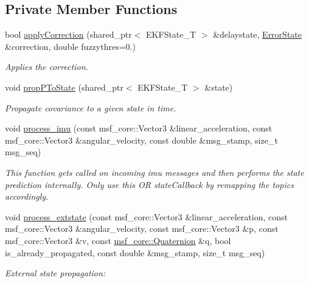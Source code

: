 \subsection*{Private Member Functions}
\begin{DoxyCompactItemize}
\item 
bool \hyperlink{classmsf__core_1_1MSF__Core_aefec8d3cb1724a5a4457361efa61662e}{apply\-Correction} (shared\-\_\-ptr$<$ E\-K\-F\-State\-\_\-\-T $>$ \&delaystate, \hyperlink{classmsf__core_1_1MSF__Core_a01a15136971c11456e539f00b88fbf1a}{Error\-State} \&correction, double fuzzythres=0.)
\begin{DoxyCompactList}\small\item\em Applies the correction. \end{DoxyCompactList}\item 
void \hyperlink{classmsf__core_1_1MSF__Core_addb4f7a2baa6665058a78ede22253dba}{prop\-P\-To\-State} (shared\-\_\-ptr$<$ E\-K\-F\-State\-\_\-\-T $>$ \&state)
\begin{DoxyCompactList}\small\item\em Propagate covariance to a given state in time. \end{DoxyCompactList}\item 
void \hyperlink{classmsf__core_1_1MSF__Core_ac71be253d04e72ea07dcb7fd0cd6c118}{process\-\_\-imu} (const msf\-\_\-core\-::\-Vector3 \&linear\-\_\-acceleration, const msf\-\_\-core\-::\-Vector3 \&angular\-\_\-velocity, const double \&msg\-\_\-stamp, size\-\_\-t msg\-\_\-seq)
\begin{DoxyCompactList}\small\item\em This function gets called on incoming imu messages and then performs the state prediction internally. Only use this O\-R state\-Callback by remapping the topics accordingly. \end{DoxyCompactList}\item 
void \hyperlink{classmsf__core_1_1MSF__Core_ab02c0a51189519d1ba29485a61ba4d3d}{process\-\_\-extstate} (const msf\-\_\-core\-::\-Vector3 \&linear\-\_\-acceleration, const msf\-\_\-core\-::\-Vector3 \&angular\-\_\-velocity, const msf\-\_\-core\-::\-Vector3 \&p, const msf\-\_\-core\-::\-Vector3 \&v, const \hyperlink{namespacemsf__core_a044c525dd7800e2e2f4bb86fc565a7c7}{msf\-\_\-core\-::\-Quaternion} \&q, bool is\-\_\-already\-\_\-propagated, const double \&msg\-\_\-stamp, size\-\_\-t msg\-\_\-seq)
\begin{DoxyCompactList}\small\item\em External state propagation\-: \end{DoxyCompactList}\item 

\end{DoxyCompactItemize}
